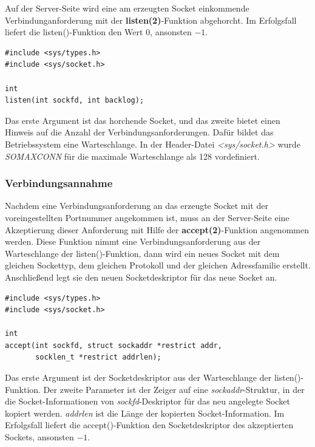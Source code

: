 Auf der Server-Seite wird eine am erzeugten Socket einkommende Verbindunganforderung mit der \textbf{listen(2)}-Funktion abgehorcht. Im Erfolgsfall liefert die listen()-Funktion den Wert $0$, ansonsten $-1$. \smallskip \smallskip

\begin{verbatim}
#include <sys/types.h>
#include <sys/socket.h>

int
listen(int sockfd, int backlog);
\end{verbatim}
\smallskip \smallskip

Das erste Argument ist das horchende Socket, und das zweite bietet einen Hinweis auf die Anzahl der Verbindungsanforderungen. Dafür bildet das Betriebssystem eine Warteschlange. In der Header-Datei \textit{<sys/socket.h>} wurde \textit{SOMAXCONN} für die maximale Warteschlange als 128 vordefiniert. 

\subsubsection{Verbindungsannahme}

Nachdem eine Verbindungsanforderung an das erzeugte Socket mit der voreingestellten Portnummer angekommen ist, muss an der Server-Seite eine Akzeptierung dieser Anforderung mit Hilfe der \textbf{accept(2)}-Funktion angenommen werden. Diese Funktion nimmt eine Verbindungsanforderung aus der Warteschlange der listen()-Funktion, dann wird ein neues Socket mit dem gleichen Sockettyp, dem gleichen Protokoll und der gleichen Adressfamilie erstellt. Anschließend legt sie den neuen Socketdeskriptor für das neue Socket an. \smallskip \smallskip

\begin{verbatim}
#include <sys/types.h>
#include <sys/socket.h>

int
accept(int sockfd, struct sockaddr *restrict addr, 
       socklen_t *restrict addrlen);
\end{verbatim}
\smallskip \smallskip

Das erste Argument ist der Socketdeskriptor aus der Warteschlange der listen()-Funktion. Der zweite Parameter ist der Zeiger auf eine \textit{sockaddr}-Struktur, in der die Socket-Informationen von \textit{sockfd}-Deskriptor für das neu angelegte Socket kopiert werden. \textit{addrlen} ist die Länge der kopierten Socket-Information. Im Erfolgsfall liefert die accept()-Funktion den Socketdeskriptor des akzeptierten Sockets, ansonsten $-1$.

